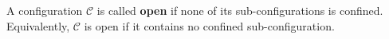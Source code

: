 A configuration $\mathcal{C}$ is called \textbf{open} if none of its sub-configurations is confined. Equivalently, $\mathcal{C}$ is open if it contains no confined sub-configuration.
